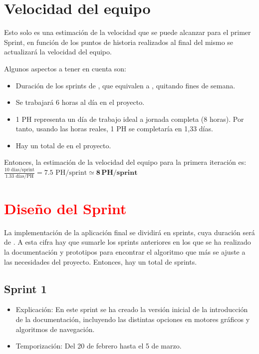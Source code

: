 \newpage

\section{Velocidad del equipo}

Esto solo es una estimación de la velocidad que se puede alcanzar para el primer Sprint, en función de los puntos de historia realizados al final del mismo se actualizará la velocidad del equipo.

\bigskip

Algunos aspectos a tener en cuenta son:

\begin{itemize}
    \item Duración de los sprints de \sprintLength, que equivalen a \actualSprintLength, quitando fines de semana.
    \item Se trabajará 6 horas al día en el proyecto.
    \item 1 PH representa un día de trabajo ideal a jornada completa (8 horas). Por tanto, usando las horas reales, 1 PH se completaría en 1,33 días.
    \item Hay un total de \projectph en el proyecto.
\end{itemize}

\bigskip

Entonces, la estimación de la velocidad del equipo para la primera iteración es: $\frac{10 \text{ días/sprint}}{1.33 \text{ días/PH}} = 7.5 \text{ PH/sprint} \simeq \mathbf{8\,PH/sprint}$

\section{\textcolor{red}{Diseño del Sprint}}


La implementación de la aplicación final se dividirá en \sprintNro sprints, cuya duración será de \sprintLength. A esta cifra hay que sumarle los \docSprints sprints anteriores en los que se ha realizado la documentación y prototipos para encontrar el algoritmo que más se ajuste a las necesidades del proyecto. Entonces, hay un total de \totalSprints sprints.

\subsection{Sprint 1}
\begin{itemize}
    \item Explicación: En este sprint se ha creado la versión inicial de la introducción de la documentación, incluyendo las distintas opciones en motores gráficos y algoritmos de navegación.

    \item Temporización: Del 20 de febrero hasta el 5 de marzo.
\end{itemize}

